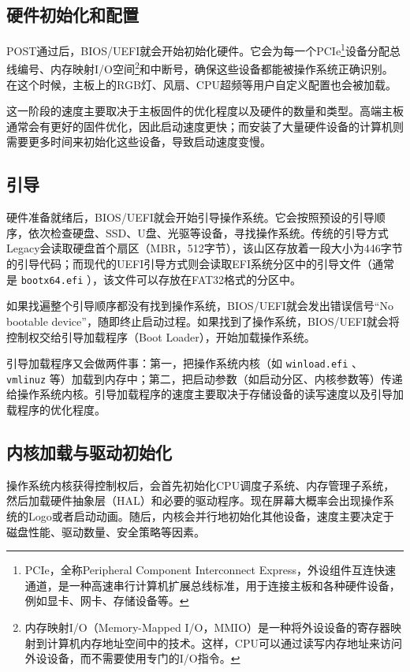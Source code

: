 \subsection{硬件初始化和配置}

POST通过后，BIOS/UEFI就会开始初始化硬件。它会为每一个PCIe\footnote{PCIe，全称Peripheral Component Interconnect Express，外设组件互连快速通道，是一种高速串行计算机扩展总线标准，用于连接主板和各种硬件设备，例如显卡、网卡、存储设备等。}设备分配总线编号、内存映射I/O空间\footnote{内存映射I/O（Memory-Mapped I/O，MMIO）是一种将外设设备的寄存器映射到计算机内存地址空间中的技术。这样，CPU可以通过读写内存地址来访问外设设备，而不需要使用专门的I/O指令。}和中断号，确保这些设备都能被操作系统正确识别。在这个时候，主板上的RGB灯、风扇、CPU超频等用户自定义配置也会被加载。

这一阶段的速度主要取决于主板固件的优化程度以及硬件的数量和类型。高端主板通常会有更好的固件优化，因此启动速度更快；而安装了大量硬件设备的计算机则需要更多时间来初始化这些设备，导致启动速度变慢。

\subsection{引导}

硬件准备就绪后，BIOS/UEFI就会开始引导操作系统。它会按照预设的引导顺序，依次检查硬盘、SSD、U盘、光驱等设备，寻找操作系统。传统的引导方式Legacy会读取硬盘首个扇区（MBR，512字节），该山区存放着一段大小为446字节的引导代码；而现代的UEFI引导方式则会读取EFI系统分区中的引导文件（通常是 \texttt{bootx64.efi} ），该文件可以存放在FAT32格式的分区中。

如果找遍整个引导顺序都没有找到操作系统，BIOS/UEFI就会发出错误信号“No bootable device”，随即终止启动过程。如果找到了操作系统，BIOS/UEFI就会将控制权交给引导加载程序（Boot Loader），开始加载操作系统。

引导加载程序又会做两件事：第一，把操作系统内核（如 \texttt{winload.efi} 、 \texttt{vmlinuz} 等）加载到内存中；第二，把启动参数（如启动分区、内核参数等）传递给操作系统内核。引导加载程序的速度主要取决于存储设备的读写速度以及引导加载程序的优化程度。

\subsection{内核加载与驱动初始化}

操作系统内核获得控制权后，会首先初始化CPU调度子系统、内存管理子系统，然后加载硬件抽象层（HAL）和必要的驱动程序。现在屏幕大概率会出现操作系统的Logo或者启动动画。随后，内核会并行地初始化其他设备，速度主要决定于磁盘性能、驱动数量、安全策略等因素。

